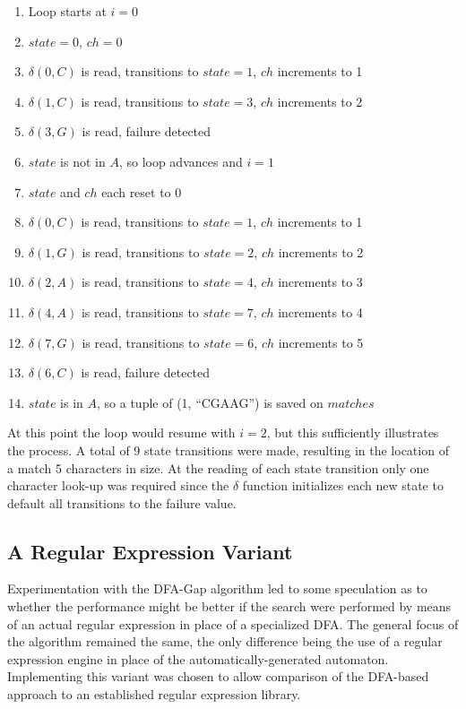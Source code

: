 \begin{enumerate}
\item Loop starts at $i=0$
\item $state=0$, $ch=0$
\item $\delta(0,C)$ is read, transitions to $state=1$, $ch$ increments to 1
\item $\delta(1,C)$ is read, transitions to $state=3$, $ch$ increments to 2
\item $\delta(3,G)$ is read, failure detected
\item $state$ is not in $A$, so loop advances and $i=1$
\item $state$ and $ch$ each reset to 0
\item $\delta(0,C)$ is read, transitions to $state=1$, $ch$ increments to 1
\item $\delta(1,G)$ is read, transitions to $state=2$, $ch$ increments to 2
\item $\delta(2,A)$ is read, transitions to $state=4$, $ch$ increments to 3
\item $\delta(4,A)$ is read, transitions to $state=7$, $ch$ increments to 4
\item $\delta(7,G)$ is read, transitions to $state=6$, $ch$ increments to 5
\item $\delta(6,C)$ is read, failure detected
\item $state$ is in $A$, so a tuple of (1, ``CGAAG'') is saved on $matches$
\end{enumerate}

At this point the loop would resume with $i=2$, but this sufficiently illustrates the process. A total of 9 state transitions were made, resulting in the location of a match 5 characters in size. At the reading of each state transition only one character look-up was required since the $\delta$ function initializes each new state to default all transitions to the failure value.

\subsection{A Regular Expression Variant}
\label{subsec:regexp_variant}

Experimentation with the DFA-Gap algorithm led to some speculation as to whether the performance might be better if the search were performed by means of an actual regular expression in place of a specialized DFA. The general focus of the algorithm remained the same, the only difference being the use of a regular expression engine in place of the automatically-generated automaton. Implementing this variant was chosen to allow comparison of the DFA-based approach to an established regular expression library.

